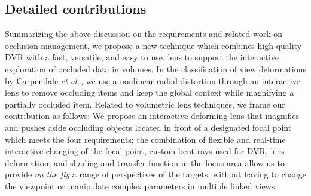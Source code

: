 \subsection{Detailed contributions}
%
Summarizing the above discussion on the requirements and related work on occlusion management, we propose a new technique which combines high-quality DVR with a fast, versatile, and easy to use, lens to support the interactive exploration of occluded data in volumes. In the classification of view deformations by Carpendale \emph{et al.}\,\cite{595268}, we use a nonlinear radial distortion through an interactive lens to remove occluding items and keep the global context while magnifying a partially occluded item. Related to volumetric lens techniques, we frame our contribution as follows: We propose an interactive deforming lens that magnifies and pushes aside occluding objects located in front of a designated focal point which meets the four requirements; the combination of flexible and real-time interactive changing of the focal point, custom bent rays used for DVR, lens deformation, and shading and transfer function in the focus area allow us to provide \emph{on the fly} a range of perspectives of the targets, without having to change the viewpoint or manipulate complex parameters in multiple linked views.


